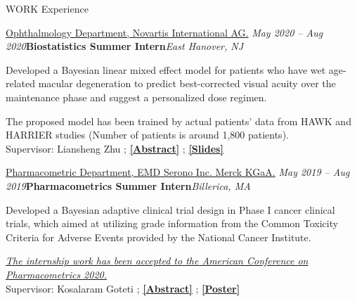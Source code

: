 \documentclass{resume} %
\begin{document}
\begin{rSection}{WORK Experience}

\begin{rSubsection}{
\href{https://www.pharma.us.novartis.com/}{Ophthalmology Department, Novartis International AG.}
}{\em May 2020 -- Aug 2020}{\textbf{Biostatistics Summer Intern}}{\em East Hanover, NJ}
\item 
Developed a Bayesian linear mixed effect model for patients who have wet age-related macular degeneration to predict best-corrected visual acuity over the maintenance phase and suggest a personalized dose regimen. 
\item The proposed model has been trained by actual patients' data from HAWK and HARRIER studies (Number of patients is around 1,800 patients).
\\
Supervisor:
Liansheng Zhu
; 
\href{https://sites.google.com/view/seyoonlee/home/projects/novartis-summer-internship-project?authuser=0#h.dfc3zhswkx8m}
{\underline{\textbf{[Abstract]}}}
; 
\href{https://www.dropbox.com/s/noy7mcoyoo31xj6/wetAMD_Research_Se_Yoon_Lee_PhD.pdf?dl=0}{\underline{\textbf{[Slides]}}}
\end{rSubsection}


\begin{rSubsection}{
\href{https://www.emdserono.com/us-en}{
Pharmacometric Department, EMD Serono Inc. Merck KGaA.}
}{\em May 2019 -- Aug 2019}{\textbf{Pharmacometrics Summer Intern}}{\em Billerica, MA}
\item 
Developed a Bayesian adaptive clinical trial design in Phase I cancer clinical trials, which aimed at utilizing grade information from the Common Toxicity Criteria for Adverse Events provided by the National Cancer Institute.
\item 
\emph{
\href{https://www.go-acop.org/}{The internship work has been accepted to the American Conference on Pharmacometrics 2020.}
}
\\
Supervisor:
Kosalaram Goteti
; 
\href{https://sites.google.com/view/seyoonlee/home/projects/merck-group-summer-internship-project?authuser=0#h.lnkjghpa5ikt}
{\underline{\textbf{[Abstract]}}}
;
\href{https://www.dropbox.com/s/dnlynbzl6ojmgwh/ACOP_Se_Yoon_Lee_PhD.pdf?dl=0}
{\underline{\textbf{[Poster]}}}
\end{rSubsection}



\end{rSection}
\end{document}
